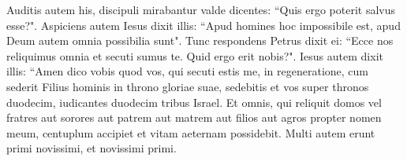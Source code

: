 \begin{biblechapter}
\verse Auditis autem his, discipuli mirabantur valde dicentes: “Quis ergo poterit salvus esse?". 
\verse Aspiciens autem Iesus dixit illis: “Apud homines hoc impossibile est, apud Deum autem omnia possibilia sunt". 
\verse Tunc respondens Petrus dixit ei: “Ecce nos reliquimus omnia et secuti sumus te. Quid ergo erit nobis?". 
\verse Iesus autem dixit illis: “Amen dico vobis quod vos, qui secuti estis me, in regeneratione, cum sederit Filius hominis in throno gloriae suae, sedebitis et vos super thronos duodecim, iudicantes duodecim tribus Israel. 
\verse Et omnis, qui reliquit domos vel fratres aut sorores aut patrem aut matrem aut filios aut agros propter nomen meum, centuplum accipiet et vitam aeternam possidebit. 
\verse Multi autem erunt primi novissimi, et novissimi primi. 
\end{biblechapter}

